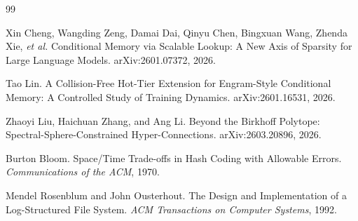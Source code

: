 \documentclass[11pt]{article}
\begin{document}
\begin{thebibliography}{99}

Xin Cheng, Wangding Zeng, Damai Dai, Qinyu Chen, Bingxuan Wang, Zhenda Xie, \emph{et al.}
\newblock Conditional Memory via Scalable Lookup: A New Axis of Sparsity for Large Language Models.
\newblock arXiv:2601.07372, 2026.

Tao Lin.
\newblock A Collision-Free Hot-Tier Extension for Engram-Style Conditional Memory: A Controlled Study of Training Dynamics.
\newblock arXiv:2601.16531, 2026.

Zhaoyi Liu, Haichuan Zhang, and Ang Li.
\newblock Beyond the Birkhoff Polytope: Spectral-Sphere-Constrained Hyper-Connections.
\newblock arXiv:2603.20896, 2026.

Burton Bloom.
\newblock Space/Time Trade-offs in Hash Coding with Allowable Errors.
\newblock \emph{Communications of the ACM}, 1970.

Mendel Rosenblum and John Ousterhout.
\newblock The Design and Implementation of a Log-Structured File System.
\newblock \emph{ACM Transactions on Computer Systems}, 1992.

\end{thebibliography}
\end{document}

